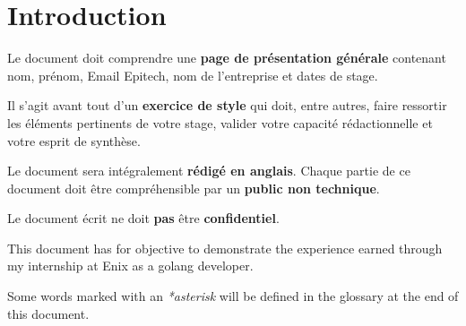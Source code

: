\chapter{Introduction}

\color{red}
Le document doit comprendre une \textbf{page de présentation générale} contenant nom, prénom, Email Epitech, nom de l’entreprise et dates de stage.

Il s’agit avant tout d’un \textbf{exercice de style} qui doit, entre autres, faire ressortir les éléments
pertinents de votre stage, valider votre capacité rédactionnelle et votre esprit de synthèse.

Le document sera intégralement \textbf{rédigé en anglais}. Chaque partie de ce document doit être
compréhensible par un \textbf{public non technique}.

Le document écrit ne doit \textbf{pas} être \textbf{confidentiel}.
\color{black}

This document has for objective to demonstrate the experience earned through my internship at Enix as a golang developer.

Some words marked with an \emph{*asterisk} will be defined in the glossary at the end of this document.

\clearpage

